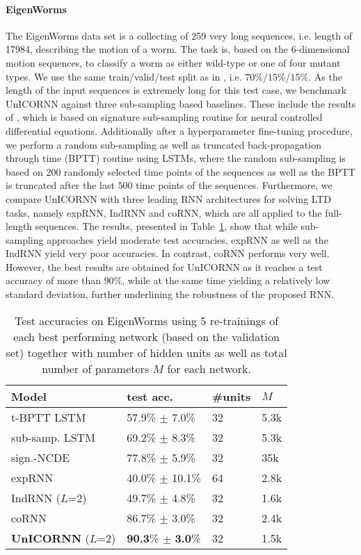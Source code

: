 \documentclass{article}
\newcommand{\Tref}[1]{Table~\ref{#1}}
\begin{document}
\paragraph{EigenWorms}
The EigenWorms data set \cite{eigenworms} is a collecting of 259 very long sequences, i.e. length of 17984, describing the motion of a worm. The task is, based on the 6-dimensional motion sequences, to classify a worm as either wild-type or one of four mutant types. We use the same train/valid/test split as in \cite{log_ode}, i.e. $70\%$/$15\%$/$15\%$. As the length of the input sequences is extremely long for this test case, we benchmark UnICORNN against three sub-sampling based baselines. These include the results of \cite{log_ode}, which is based on signature sub-sampling routine for neural controlled differential equations. Additionally after a hyperparameter fine-tuning procedure, we perform a random sub-sampling as well as truncated back-propagation through time (BPTT) routine using LSTMs, where the random sub-sampling is based on $200$ randomly selected time points of the sequences as well as the BPTT is truncated after the last $500$ time points of the sequences. Furthermore, we compare UnICORNN with three leading RNN architectures for solving LTD tasks, namely expRNN, IndRNN and coRNN, which are all applied to the full-length sequences. The results, presented in \Tref{tab:worms}, show that while sub-sampling approaches yield moderate test accuracies, expRNN as well as the IndRNN yield very poor accuracies. In contrast, coRNN performs very well. However, the best results are obtained for UnICORNN as it reaches a test accuracy of more than $90\%$, while at the same time yielding a relatively low standard deviation, further underlining the robustness of the proposed RNN.
\begin{table}[ht]
\caption{Test accuracies on EigenWorms using $5$ re-trainings of each best performing network (based on the validation set) together with number of hidden units as well as total number of parameters $M$ for each network.}
\label{tab:worms}
\vskip 0.15in
\begin{center}
\begin{small}
\begin{sc}
\begin{tabular}{llll}
\toprule
Model     & test acc. & \#units & $M$ \\
\midrule
t-BPTT LSTM & 57.9\% $\pm$ 7.0\% &32 & 5.3k\\
sub-samp. LSTM &  69.2\% $\pm$ 8.3\% &32 & 5.3k\\
sign.-NCDE & 77.8\% $\pm$ 5.9\% & 32 & 35k\\
\midrule
expRNN & 40.0\% $\pm$ 10.1\% & 64 & 2.8k \\
IndRNN ($L$=2) & 49.7\% $\pm$ 4.8\% & 32 & 1.6k \\
coRNN & 86.7\% $\pm$ 3.0\%&32 & 2.4k \\
\textbf{UnICORNN} ($L$=2) & \textbf{90.3}\% $\pm$ \textbf{3.0}\% & 32 & 1.5k\\
\bottomrule
\end{tabular}
\end{sc}
\end{small}
\end{center}
\vskip -0.1in
\end{table}
\end{document}
